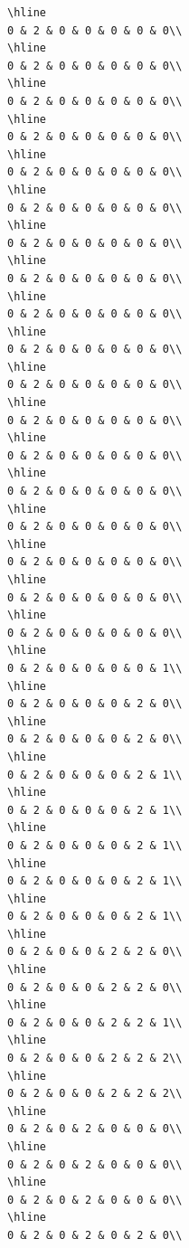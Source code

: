 \documentclass[
]{article}
\begin{document}
\begin{verbatim}
\hline
0 & 2 & 0 & 0 & 0 & 0 & 0\\
\hline
0 & 2 & 0 & 0 & 0 & 0 & 0\\
\hline
0 & 2 & 0 & 0 & 0 & 0 & 0\\
\hline
0 & 2 & 0 & 0 & 0 & 0 & 0\\
\hline
0 & 2 & 0 & 0 & 0 & 0 & 0\\
\hline
0 & 2 & 0 & 0 & 0 & 0 & 0\\
\hline
0 & 2 & 0 & 0 & 0 & 0 & 0\\
\hline
0 & 2 & 0 & 0 & 0 & 0 & 0\\
\hline
0 & 2 & 0 & 0 & 0 & 0 & 0\\
\hline
0 & 2 & 0 & 0 & 0 & 0 & 0\\
\hline
0 & 2 & 0 & 0 & 0 & 0 & 0\\
\hline
0 & 2 & 0 & 0 & 0 & 0 & 0\\
\hline
0 & 2 & 0 & 0 & 0 & 0 & 0\\
\hline
0 & 2 & 0 & 0 & 0 & 0 & 0\\
\hline
0 & 2 & 0 & 0 & 0 & 0 & 0\\
\hline
0 & 2 & 0 & 0 & 0 & 0 & 0\\
\hline
0 & 2 & 0 & 0 & 0 & 0 & 0\\
\hline
0 & 2 & 0 & 0 & 0 & 0 & 0\\
\hline
0 & 2 & 0 & 0 & 0 & 0 & 1\\
\hline
0 & 2 & 0 & 0 & 0 & 2 & 0\\
\hline
0 & 2 & 0 & 0 & 0 & 2 & 0\\
\hline
0 & 2 & 0 & 0 & 0 & 2 & 1\\
\hline
0 & 2 & 0 & 0 & 0 & 2 & 1\\
\hline
0 & 2 & 0 & 0 & 0 & 2 & 1\\
\hline
0 & 2 & 0 & 0 & 0 & 2 & 1\\
\hline
0 & 2 & 0 & 0 & 0 & 2 & 1\\
\hline
0 & 2 & 0 & 0 & 2 & 2 & 0\\
\hline
0 & 2 & 0 & 0 & 2 & 2 & 0\\
\hline
0 & 2 & 0 & 0 & 2 & 2 & 1\\
\hline
0 & 2 & 0 & 0 & 2 & 2 & 2\\
\hline
0 & 2 & 0 & 0 & 2 & 2 & 2\\
\hline
0 & 2 & 0 & 2 & 0 & 0 & 0\\
\hline
0 & 2 & 0 & 2 & 0 & 0 & 0\\
\hline
0 & 2 & 0 & 2 & 0 & 0 & 0\\
\hline
0 & 2 & 0 & 2 & 0 & 2 & 0\\

\end{verbatim}
\end{document}
